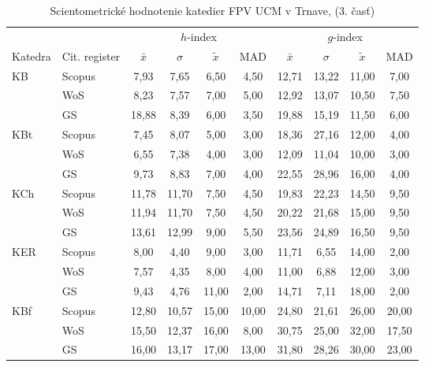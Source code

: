 {\begin{table}
  \centering\small
  \caption[Hodnotenie FPV\,--\,$h$-index a $h$-index]{Scientometrické hodnotenie katedier FPV UCM v Trnave, (3. časť)}
\label{tab:3-staff.results}
\begin{tabularx}{\textwidth}{XXcccc@{\hspace{3ex}}cccc}
  \toprule\noalign{\vspace{.3ex}}
       &           & \multicolumn{4}{c}{$h$-index}     & \multicolumn{4}{c}{$g$-index}    \\
  Katedra & Cit. register & $\bar{x}$      & $\sigma$  & $\tilde{x}$ & MAD  & $\bar{x}$      & $\sigma$  & $\tilde{x}$  & MAD  \\[0.3ex]
  \midrule\noalign{\vspace{.5ex}}
 KB   & Scopus & 7,93    & 7,65  & 6,50  & 4,50  & 12,71   & 13,22 & 11,00 & 7,00  \\
      & WoS    & 8,23    & 7,57  & 7,00  & 5,00  & 12,92   & 13,07 & 10,50 & 7,50  \\
      & GS     & 18,88   & 8,39  & 6,00  & 3,50  & 19,88   & 15,19 & 11,50 & 6,00  \\[3ex]
 KBt  & Scopus & 7,45    & 8,07  & 5,00  & 3,00  & 18,36   & 27,16 & 12,00 & 4,00  \\
      & WoS    & 6,55    & 7,38  & 4,00  & 3,00  & 12,09   & 11,04 & 10,00 & 3,00  \\
      & GS     & 9,73    & 8,83  & 7,00  & 4,00  & 22,55   & 28,96 & 16,00 & 4,00  \\[3ex]
 KCh  & Scopus & 11,78   & 11,70 & 7,50  & 4,50  & 19,83   & 22,23 & 14,50 & 9,50  \\
      & WoS    & 11,94   & 11,70 & 7,50  & 4,50  & 20,22   & 21,68 & 15,00 & 9,50  \\
      & GS     & 13,61   & 12,99 & 9,00  & 5,50  & 23,56   & 24,89 & 16,50 & 9,50  \\[3ex]
 KER  & Scopus & 8,00    & 4,40  & 9,00  & 3,00  & 11,71   & 6,55  & 14,00 & 2,00  \\
      & WoS    & 7,57    & 4,35  & 8,00  & 4,00  & 11,00   & 6,88  & 12,00 & 3,00  \\
      & GS     & 9,43    & 4,76  & 11,00 & 2,00  & 14,71   & 7,11  & 18,00 & 2,00  \\[3ex]
 KBf  & Scopus & 12,80   & 10,57 & 15,00 & 10,00 & 24,80   & 21,61 & 26,00 & 20,00 \\
      & WoS    & 15,50   & 12,37 & 16,00 & 8,00  & 30,75   & 25,00 & 32,00 & 17,50 \\
      & GS     & 16,00   & 13,17 & 17,00 & 13,00 & 31,80   & 28,26 & 30,00 & 23,00 \\[3ex]

\end{tabularx}
\end{table}}

